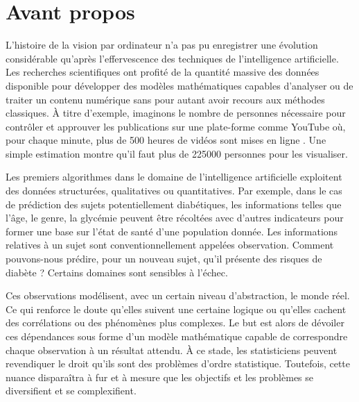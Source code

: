 \chapter*{Avant propos}
L'histoire de la vision par ordinateur n'a pas pu enregistrer une évolution considérable qu'après l'effervescence des techniques de l'intelligence artificielle. Les recherches scientifiques ont profité de la quantité massive des données disponible pour développer des modèles mathématiques capables d'analyser ou de traiter un contenu numérique sans pour autant avoir recours aux méthodes classiques. \`A titre d'exemple, imaginons le nombre de personnes nécessaire pour contrôler et approuver les publications sur une plate-forme comme YouTube où, pour chaque minute, plus de 500 heures de vidéos sont mises en ligne \needRef. Une simple estimation montre qu'il faut plus de 225000 personnes pour les visualiser.

Les premiers algorithmes dans le domaine de l'intelligence artificielle exploitent des données structurées, qualitatives ou quantitatives. Par exemple, dans le cas de prédiction des sujets potentiellement diabétiques, les informations telles que l'âge, le genre, la glycémie peuvent être récoltées avec d'autres indicateurs pour former une base sur l'état de santé d'une population donnée. Les informations relatives à un sujet sont conventionnellement appelées observation. Comment pouvons-nous prédire, pour un nouveau sujet, qu'il présente des risques de diabète ? Certains domaines sont sensibles à l'échec.

Ces observations modélisent, avec un certain niveau d'abstraction, le monde réel. Ce qui renforce le doute qu'elles suivent une certaine logique ou qu'elles cachent des corrélations ou des phénomènes plus complexes. Le but est alors de dévoiler ces dépendances sous forme d'un modèle mathématique capable de correspondre chaque observation à un résultat attendu. \`A ce stade, les statisticiens peuvent revendiquer le droit qu'ils sont des problèmes d'ordre statistique. Toutefois, cette nuance disparaîtra à fur et à mesure que les objectifs et les problèmes se diversifient et se complexifient.

